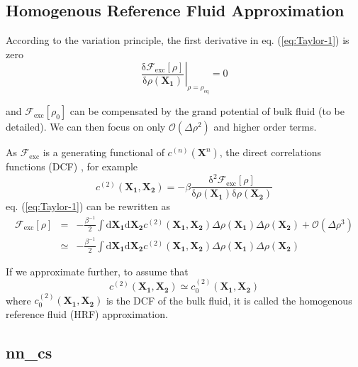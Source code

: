 \subsection{Homogenous Reference Fluid Approximation}

According to the variation principle, the first derivative in eq.
(\ref{eq:Taylor-1}) is zero
\begin{equation}
\left.\frac{\mathrm{\delta}\mathcal{F}_{\mathrm{exc}}\left[\rho\right]}{\mathrm{\delta}\rho(\mathbf{X_{1}})}\right|_{\rho=\rho_{\mathrm{eq}}}=0
\end{equation}


and $\mathcal{F}_{\mathrm{exc}}\left[\rho_{0}\right]$ can be compensated
by the grand potential of bulk fluid (to be detailed). We can then
focus on only $\mathcal{O}(\Delta\rho^{2})$ and higher order terms.

As $\mathcal{F}_{\mathrm{exc}}$ is a generating functional of $c^{(n)}(\mathbf{X}^{n})$,
the direct correlations functions (DCF) \citep{Hensen-McDonald},
for example
\begin{equation}
c^{(2)}(\mathbf{X_{1}},\mathbf{X_{2}})=-\beta\frac{\mathrm{\delta}^{2}\mathcal{F}_{\mathrm{exc}}\left[\rho\right]}{\mathrm{\delta}\rho(\mathbf{X_{1}})\mathrm{\delta}\rho(\mathbf{X_{2}})}
\end{equation}
eq. (\ref{eq:Taylor-1}) can be rewritten as
\begin{eqnarray}
\mathcal{F}_{\mathrm{exc}}\left[\rho\right] & = & -\frac{\beta^{-1}}{2}\int\mathrm{d}\mathbf{X_{1}}\mathrm{d}\mathbf{X_{2}}c^{(2)}(\mathbf{X_{1}},\mathbf{X_{2}})\Delta\rho(\mathbf{X_{1}})\Delta\rho(\mathbf{X_{2}})+\mathcal{O}(\Delta\rho^{3})\nonumber \\
 & \simeq & -\frac{\beta^{-1}}{2}\int\mathrm{d}\mathbf{X_{1}}\mathrm{d}\mathbf{X_{2}}c^{(2)}(\mathbf{X_{1}},\mathbf{X_{2}})\Delta\rho(\mathbf{X_{1}})\Delta\rho(\mathbf{X_{2}})\label{eq:fexc-2nd-term-1}
\end{eqnarray}


If we approximate further, to assume that
\begin{equation}
c^{(2)}(\mathbf{X_{1}},\mathbf{X_{2}})\simeq c_{0}^{(2)}(\mathbf{X_{1}},\mathbf{X_{2}})
\end{equation}
where $c_{0}^{(2)}(\mathbf{X_{1}},\mathbf{X_{2}})$ is the DCF of
the bulk fluid, it is called the homogenous reference fluid (HRF) approximation.


\subsection{nn\_cs}

